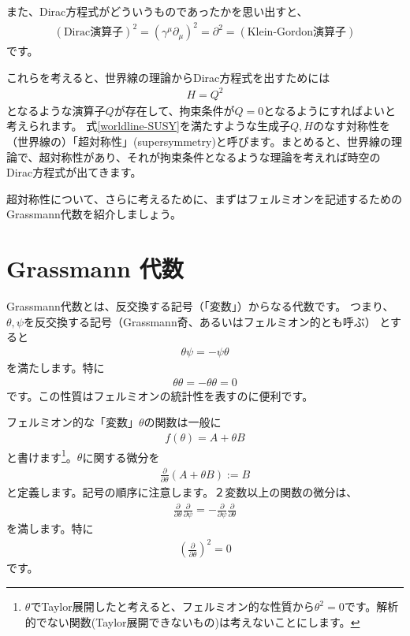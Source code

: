 \documentclass[report,paper=a4, fontsize=12pt, line_length=16cm, number_of_lines=34,dvipdfmx]{jlreq}
\numberwithin{equation}{chapter}
\numberwithin{equation}{section}
\newcommand{\del}{\partial}
\newcommand{\deldel}[2]{\frac{\del {#1}}{\del {#2}}}
\begin{document}
また、Dirac方程式がどういうものであったかを思い出すと、
\begin{align}
(\text{Dirac演算子})^2 =(\gamma^{\mu}\del_{\mu})^2
=\del^2 = (\text{Klein-Gordon演算子})
\end{align}
です。

これらを考えると、世界線の理論からDirac方程式を出すためには
\begin{align}
H=Q^2\label{worldline-SUSY}
\end{align}
となるような演算子$Q$が存在して、拘束条件が$Q=0$となるようにすればよいと考えられます。
式\eqref{worldline-SUSY}を満たすような生成子$Q,H$のなす対称性を（世界線の）「超対称性」(supersymmetry)と呼びます。まとめると、世界線の理論で、超対称性があり、それが拘束条件となるような理論を考えれば時空のDirac方程式が出てきます。

超対称性について、さらに考えるために、まずはフェルミオンを記述するためのGrassmann代数を紹介しましょう。
\section{Grassmann 代数}
Grassmann代数とは、反交換する記号（「変数」）からなる代数です。
つまり、$\theta,\psi$を反交換する記号（Grassmann奇、あるいはフェルミオン的とも呼ぶ）
とすると
\begin{align}
\theta\psi=-\psi\theta
\end{align}
を満たします。特に
\begin{align}
\theta\theta = -\theta\theta =0
\end{align}
です。この性質はフェルミオンの統計性を表すのに便利です。

フェルミオン的な「変数」$\theta$の関数は一般に
\begin{align}
f(\theta)=A+\theta B
\end{align}
と書けます\footnote{$\theta$でTaylor展開したと考えると、フェルミオン的な性質から$\theta^2=0$です。解析的でない関数(Taylor展開できないもの)は考えないことにします。}。$\theta$に関する微分を
\begin{align}
\deldel{}{\theta} (A+\theta B):=B
\end{align}
と定義します。記号の順序に注意します。２変数以上の関数の微分は、
\begin{align}
\deldel{}{\theta}\deldel{}{\psi}
=
-\deldel{}{\psi}\deldel{}{\theta}
\end{align}
を満します。特に
\begin{align}
\left(\deldel{}{\theta}\right)^2=0
\end{align}
です。
\end{document}
